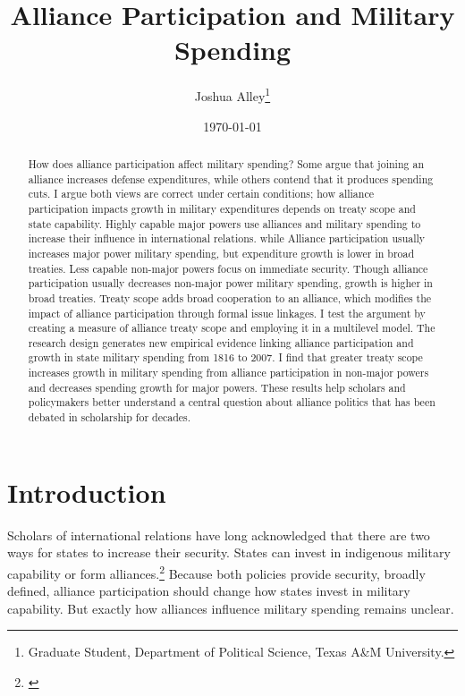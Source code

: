 \documentclass[12pt]{article}
\title{\textbf{Alliance Participation and Military Spending}}
\author{Joshua Alley\footnote{Graduate Student,
Department of Political Science, Texas A\&M University.}}
\date{{\normalsize \today}}
\begin{document}
\maketitle 

\doublespace 

\begin{abstract}
How does alliance participation affect military spending? 
Some argue that joining an alliance increases defense expenditures, while others contend that it produces spending cuts.
I argue both views are correct under certain conditions; how alliance participation impacts growth in military expenditures depends on treaty scope and state capability. 
Highly capable major powers use alliances and military spending to increase their influence in international relations. while 
Alliance participation usually increases major power military spending, but expenditure growth is lower in broad treaties.
Less capable non-major powers focus on immediate security. 
Though alliance participation usually decreases non-major power military spending, growth is higher in broad treaties. 
Treaty scope adds broad cooperation to an alliance, which modifies the impact of alliance participation through formal issue linkages. 
I test the argument by creating a measure of alliance treaty scope and employing it in a multilevel model. 
The research design generates new empirical evidence linking alliance participation and growth in state military spending from 1816 to 2007. 
I find that greater treaty scope increases growth in military spending from alliance participation in non-major powers and decreases spending growth for major powers.  
These results help scholars and policymakers better understand a central question about alliance politics that has been debated in scholarship for decades. 
\end{abstract}


\newpage 


\section{Introduction}


Scholars of international relations have long acknowledged that there are two ways for states to increase their security. 
States can invest in indigenous military capability or form alliances.\footnote{\citep{Morgenthau1948, Altfield1984, Morrow1993}}
Because both policies provide security, broadly defined, alliance participation should change how states invest in military capability. 
But exactly how alliances influence military spending remains unclear. 
\end{document}
